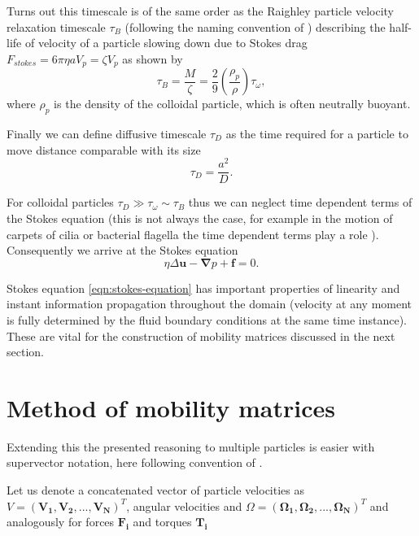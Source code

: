 \documentclass{doctoral}
\begin{document}
Turns out this timescale is of the same order as the Raighley particle velocity relaxation timescale $\tau_B$ (following the naming convention of \textcite{vanKampen_2011}) describing the half-life of velocity of a particle slowing down due to Stokes drag $F_{stokes} = 6 \pi \eta a V_p = \zeta V_p$ as shown by
\begin{equation}
    \tau_B = \frac{M}{\zeta} = \frac{2}{9} \left( \frac{\rho_p}{\rho} \right) \tau_\omega,
    \label{eqn:raighley-timescale}
\end{equation}
where $\rho_p$ is the density of the colloidal particle, which is often neutrally buoyant.

Finally we can define diffusive timescale $\tau_D$ as the time required for a particle to move distance comparable with its size
\begin{equation}
    \tau_D = \frac{a^2}{D}.
    \label{eqn:diffusive-timescale}
\end{equation}

For colloidal particles $\tau_D \gg \tau_\omega \sim \tau_B$ thus we can neglect time dependent terms of the Stokes equation (this is not always the case, for example in the motion of carpets of cilia or bacterial flagella the time dependent terms play a role \cite{Wei_2021}). Consequently we arrive at the Stokes equation
\begin{equation}
    \eta \Delta \bm{u} - \bm{\nabla} p + \bm{f} = 0.
    \label{eqn:stokes-equation}
\end{equation}

Stokes equation \eqref{eqn:stokes-equation} has important properties of linearity and instant information propagation throughout the domain (velocity at any moment is fully determined by the fluid boundary conditions at the same time instance). These are vital for the construction of mobility matrices discussed in the next section.

\section{Method of mobility matrices}

Extending this the presented reasoning to multiple particles is easier with supervector notation, here following convention of \cite{Nagele_2013}.

Let us denote a concatenated vector of particle velocities as $V = (\bm{V_1},\bm{V_2},...,\bm{V_N})^{T}$, angular velocities and $\Omega = (\bm{\Omega_1},\bm{\Omega_2},...,\bm{\Omega_N})^{T}$ and analogously for forces $\bm{F_i}$ and torques $\bm{T_i}$
\end{document}
